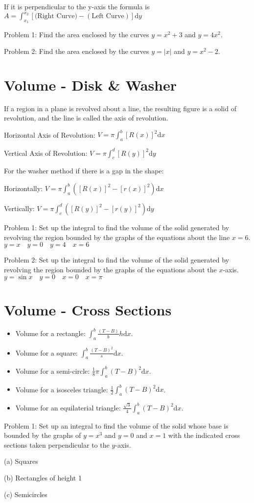 \documentclass[../abcalc.tex]{subfiles}
\begin{document}
If it is perpendicular to the y-axis the formula is $A = \int_{x_1}^{x_2}[\text{(Right Curve)}-(\text{Left Curve})]\mathrm{d}y$

Problem 1: Find the area enclosed by the curves $y=x^2+3$ and $y=4x^2$.

Problem 2: Find the area enclosed by the curves $y=|x|$ and $y=x^2-2$.
\section{Volume - Disk \& Washer}
If a region in a plane is revolved about a line, the resulting figure is a solid of revolution, and the line is called the axis of revolution.

Horizontal Axis of Revolution: $V=\pi \int_a^b [R(x)]^2\mathrm{d}x$

Vertical Axis of Revolution: $V= \pi\int_c^d [R(y)]^2 \mathrm{d}y$

For the washer method if there is a gap in the shape:

Horizontally: $V = \pi\int_a^b \left([R(x)]^2-[r(x)]^2\right)\mathrm{d}x$

Vertically: $V = \pi\int_c^d \left([R(y)]^2-[r(y)]^2\right)\mathrm{d}y$

Problem 1: Set up the integral to find the volume of the solid generated by revolving the region bounded by the graphs of the equations about the line $x=6$. $y=x \quad y=0 \quad y=4 \quad x=6$

Problem 2: Set up the integral to find the volume of the solid generated by revolving the region bounded by the graphs of the equations about the $x$-axis. $y=\sin x \quad y=0 \quad x=0 \quad x=\pi$
\section{Volume - Cross Sections}
\begin{itemize}
    \item Volume for a rectangle: $\int_a^b \frac{(T-B)}{b}h \mathrm{d}x$.
    \item Volume for a square: $\int_a^b \frac{(T-B)^2}{s}\mathrm{d}x$.
    \item Volume for a semi-circle: $\frac{1}{8}\pi \int_a^b (T-B)^2\mathrm{d}x$.
    \item Volume for a isosceles triangle: $\frac{1}{2}\int_a^b (T-B)^2\mathrm{d}x$.
    \item Volume for an equilaterial triangle: $\frac{\sqrt{3}}{4}\int_a^b (T-B)^2\mathrm{d}x$.
\end{itemize}

Problem 1: Set up an integral to find the volume of the solid whose base is bounded by the graphs of $y=x^3$ and $y=0$ and $x=1$ with the 
indicated cross sections taken perpendicular to the $y$-axis.

(a) Squares

(b) Rectangles of height 1

(c) Semicircles
\end{document}
